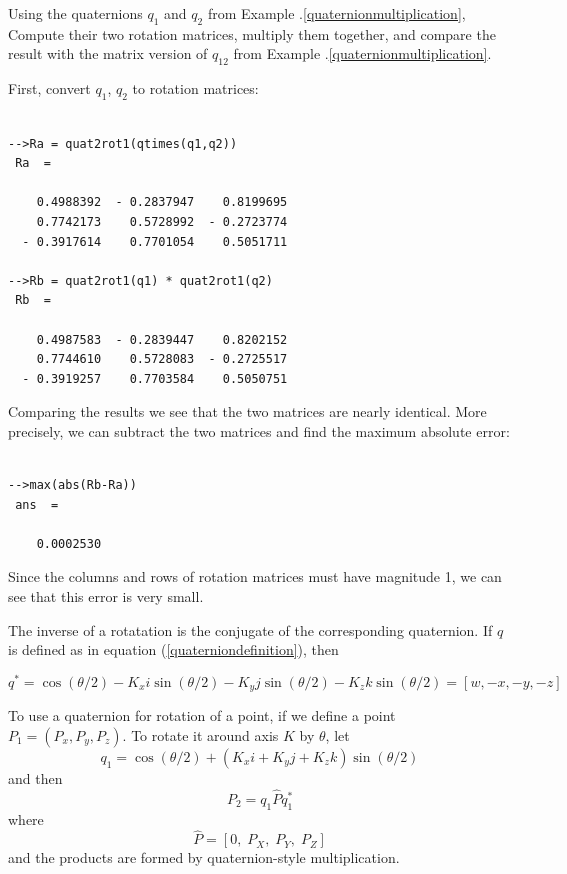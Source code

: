 \begin{Example}
Using the quaternions $q_1$ and $q_2$ from Example \thechapter.\ref{quaternionmultiplication}, Compute their two rotation matrices, multiply them together, and compare the result with the matrix version of $q_{12}$ from Example \thechapter.\ref{quaternionmultiplication}.

\vspace{0.1in}

First, convert $q_1$, $q_2$ to rotation matrices:
\begin{verbatim}

-->Ra = quat2rot1(qtimes(q1,q2))
 Ra  =

    0.4988392  - 0.2837947    0.8199695
    0.7742173    0.5728992  - 0.2723774
  - 0.3917614    0.7701054    0.5051711

-->Rb = quat2rot1(q1) * quat2rot1(q2)
 Rb  =

    0.4987583  - 0.2839447    0.8202152
    0.7744610    0.5728083  - 0.2725517
  - 0.3919257    0.7703584    0.5050751

\end{verbatim}

Comparing the results we see that the two matrices are nearly identical. More precisely, we can subtract the two matrices and find the maximum absolute error:
\begin{verbatim}

-->max(abs(Rb-Ra))
 ans  =

    0.0002530

\end{verbatim}
Since the columns and rows of rotation matrices must have magnitude 1, we can see that this error is very small.
\end{Example}


The inverse of a rotatation is the conjugate of the corresponding quaternion.  If $q$ is defined as in equation (\ref{quaterniondefinition}), then

\[
q^* = \cos(\theta/2) - K_xi\sin(\theta/2) -K_yj\sin(\theta/2) - K_zk\sin(\theta/2) = [w,-x,-y,-z]
\]


To use a quaternion for rotation of a point, if we define a point $P_1 = (P_x,P_y,P_z)$.  To rotate it around axis $K$ by $\theta$, let
\[
q_1 =  \cos(\theta/2) + (K_xi+K_yj+K_zk)\sin(\theta/2)
\]
and then
\begin{equation}\label{quaternpointrotation}
P_2 = q_1\hat{P}q_1^*
\end{equation}
where
\[
\hat{P} = [0,\; P_X,\; P_Y,\; P_Z]
\]
and the products are formed by quaternion-style multiplication.


